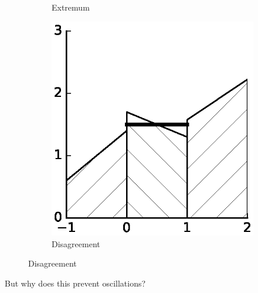\documentclass[11pt]{beamer}
\begin{document}
\begin{frame}
\begin{figure}[h]
\begin{subfigure}{0.3\textwidth}
      \caption{Extremum}
    \end{subfigure}
    \hfill
    \begin{subfigure}{0.3\textwidth}
      \centering
      \includegraphics[width=\textwidth]{figures/minmod/disagreement}
      \caption{Disagreement}
    \end{subfigure}
  \end{figure}

  \begin{center}
    But why does this prevent oscillations?
  \end{center}
\end{frame}
\end{document}
